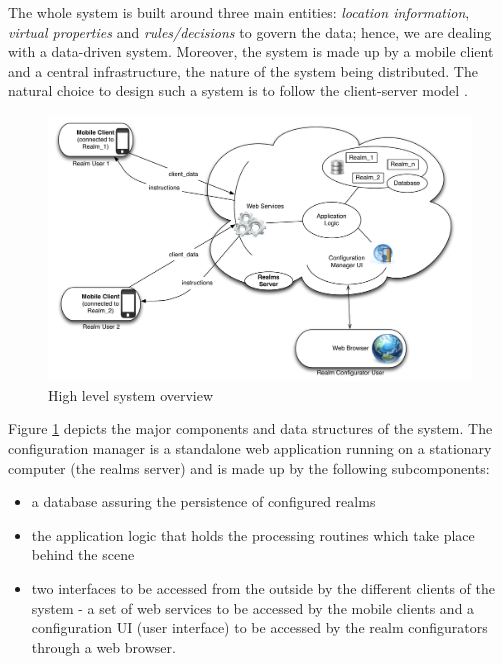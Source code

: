\noindent The whole system is built around three main entities: \emph{location information}, \emph{virtual properties} and \emph{rules/decisions} to govern the data; hence, we are dealing with a data-driven system. Moreover,  the system is made up by a mobile client and a central infrastructure, the nature of the system being distributed. The natural choice to design such a system is to follow the client-server model \cite{Coulouris:2005}.
\\

\begin{figure}
	\centering
	\includegraphics[width=1.0\linewidth]{fig/realms_high_lvl}
	\caption{High level system overview}
	\label{fig.design.high_lvl}
\end{figure}
\noindent Figure \ref{fig.design.high_lvl} depicts the major components and data structures of the system. The configuration manager is a standalone web application running on a stationary computer (the realms server) and is made up by the following subcomponents:
\begin{itemize}
	\item a database assuring the persistence of configured realms
	\item the application logic that holds the processing routines which take place behind the scene
	\item two interfaces to be accessed from the outside by the different clients of the system - a set of web services to be accessed by the mobile clients and a configuration UI (user interface) to be accessed by the realm configurators through a web browser. 
\end{itemize}

